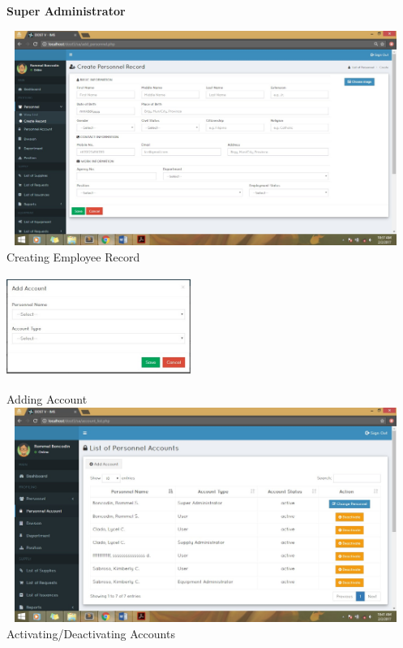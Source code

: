 \begin{center}
\begin{flushleft}
	\textbf{Super Administrator}
\end{flushleft}	

\begin{center}
	\includegraphics[width=13cm,height=7cm]{image/d3-16.jpg}\\
	Creating Employee Record \\
	\vspace{1cm}
	\includegraphics[width=6cm,height=4cm]{image/d3-17.jpg}\\
	Adding Account \\
	\vspace{1cm}
	\includegraphics[width=13cm,height=7cm]{image/d3-18.jpg}\\
	Activating/Deactivating Accounts\\
\end{center}
	
	
\end{center}
\vfill


